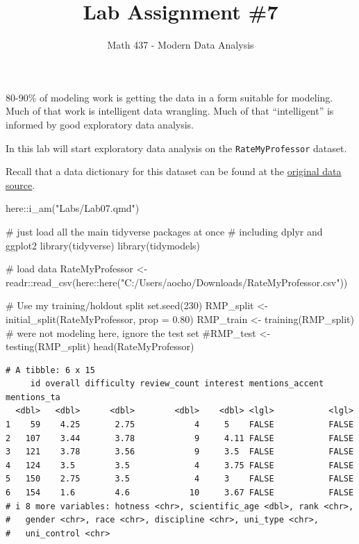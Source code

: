 \documentclass[
  letterpaper,
  DIV=11,
  numbers=noendperiod]{scrartcl}
\title{Lab Assignment \#7}
\author{Math 437 - Modern Data Analysis}
\date{}
\newenvironment{Shaded}{\begin{snugshade}}{\end{snugshade}}
\newcommand{\AttributeTok}[1]{\textcolor[rgb]{0.40,0.45,0.13}{#1}}
\newcommand{\CommentTok}[1]{\textcolor[rgb]{0.37,0.37,0.37}{#1}}
\newcommand{\DecValTok}[1]{\textcolor[rgb]{0.68,0.00,0.00}{#1}}
\newcommand{\FloatTok}[1]{\textcolor[rgb]{0.68,0.00,0.00}{#1}}
\newcommand{\FunctionTok}[1]{\textcolor[rgb]{0.28,0.35,0.67}{#1}}
\newcommand{\NormalTok}[1]{\textcolor[rgb]{0.00,0.23,0.31}{#1}}
\newcommand{\OtherTok}[1]{\textcolor[rgb]{0.00,0.23,0.31}{#1}}
\newcommand{\SpecialCharTok}[1]{\textcolor[rgb]{0.37,0.37,0.37}{#1}}
\newcommand{\StringTok}[1]{\textcolor[rgb]{0.13,0.47,0.30}{#1}}
\begin{document}
\maketitle


80-90\% of modeling work is getting the data in a form suitable for
modeling. Much of that work is intelligent data wrangling. Much of that
``intelligent'' is informed by good exploratory data analysis.

In this lab will start exploratory data analysis on the
\texttt{RateMyProfessor} dataset.

Recall that a data dictionary for this dataset can be found at the
\href{https://github.com/murrayds/aa_rmp/tree/master/data}{original data
source}.

\begin{Shaded}
\begin{Highlighting}[]
\NormalTok{here}\SpecialCharTok{::}\FunctionTok{i\_am}\NormalTok{(}\StringTok{"Labs/Lab07.qmd"}\NormalTok{)}

\CommentTok{\# just load all the main tidyverse packages at once}
\CommentTok{\# including dplyr and ggplot2}
\FunctionTok{library}\NormalTok{(tidyverse)}
\FunctionTok{library}\NormalTok{(tidymodels)}

\CommentTok{\# load data}
\NormalTok{RateMyProfessor }\OtherTok{\textless{}{-}}\NormalTok{ readr}\SpecialCharTok{::}\FunctionTok{read\_csv}\NormalTok{(here}\SpecialCharTok{::}\FunctionTok{here}\NormalTok{(}\StringTok{"C:/Users/aocho/Downloads/RateMyProfessor.csv"}\NormalTok{))}

\CommentTok{\# Use my training/holdout split}
\FunctionTok{set.seed}\NormalTok{(}\DecValTok{230}\NormalTok{)}
\NormalTok{RMP\_split }\OtherTok{\textless{}{-}} \FunctionTok{initial\_split}\NormalTok{(RateMyProfessor, }\AttributeTok{prop =} \FloatTok{0.80}\NormalTok{)}
\NormalTok{RMP\_train }\OtherTok{\textless{}{-}} \FunctionTok{training}\NormalTok{(RMP\_split)}
\CommentTok{\# we\textquotesingle{}re not modeling here, ignore the test set}
\CommentTok{\#RMP\_test \textless{}{-} testing(RMP\_split)}
\FunctionTok{head}\NormalTok{(RateMyProfessor)}
\end{Highlighting}
\end{Shaded}

\begin{verbatim}
# A tibble: 6 x 15
     id overall difficulty review_count interest mentions_accent mentions_ta
  <dbl>   <dbl>      <dbl>        <dbl>    <dbl> <lgl>           <lgl>      
1    59    4.25       2.75            4     5    FALSE           FALSE      
2   107    3.44       3.78            9     4.11 FALSE           FALSE      
3   121    3.78       3.56            9     3.5  FALSE           FALSE      
4   124    3.5        3.5             4     3.75 FALSE           FALSE      
5   150    2.75       3.5             4     3    FALSE           FALSE      
6   154    1.6        4.6            10     3.67 FALSE           FALSE      
# i 8 more variables: hotness <chr>, scientific_age <dbl>, rank <chr>,
#   gender <chr>, race <chr>, discipline <chr>, uni_type <chr>,
#   uni_control <chr>
\end{verbatim}
\end{document}
